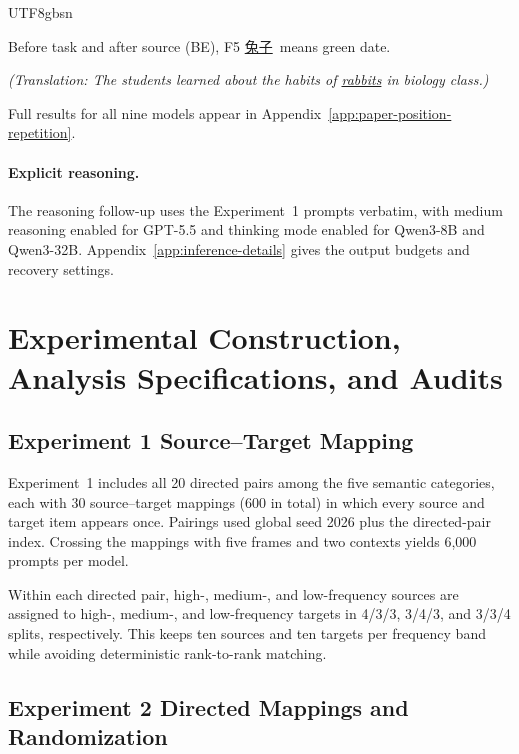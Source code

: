 \documentclass[11pt]{article}
\begin{document}
\begin{CJK*}{UTF8}{gbsn}
\begin{promptbox}{Before task and after source (BE), F5}
\underline{兔子}\ means green date.

\textit{(Translation: The students learned about the habits of \underline{rabbits} in biology class.)}
\end{promptbox}

Full results for all nine models appear in Appendix~\ref{app:paper-position-repetition}.

\paragraph{Explicit reasoning.}
The reasoning follow-up uses the Experiment~1 prompts verbatim, with medium reasoning enabled for GPT-5.5 and thinking mode enabled for Qwen3-8B and Qwen3-32B. Appendix~\ref{app:inference-details} gives the output budgets and recovery settings.

\clearpage
\flushbottom
\section{Experimental Construction, Analysis Specifications, and Audits}
\label{app:construction}

\subsection{Experiment 1 Source--Target Mapping}
\label{app:exp1-construction}

Experiment~1 includes all 20 directed pairs among the five semantic categories, each with 30 source--target mappings (600 in total) in which every source and target item appears once. Pairings used global seed 2026 plus the directed-pair index. Crossing the mappings with five frames and two contexts yields 6,000 prompts per model.

\label{app:frequency-balancing}
Within each directed pair, high-, medium-, and low-frequency sources are assigned to high-, medium-, and low-frequency targets in 4/3/3, 3/4/3, and 3/3/4 splits, respectively. This keeps ten sources and ten targets per frequency band while avoiding deterministic rank-to-rank matching.

\subsection{Experiment 2 Directed Mappings and Randomization}
\label{app:exp2-construction}


\end{CJK*}
\end{document}
